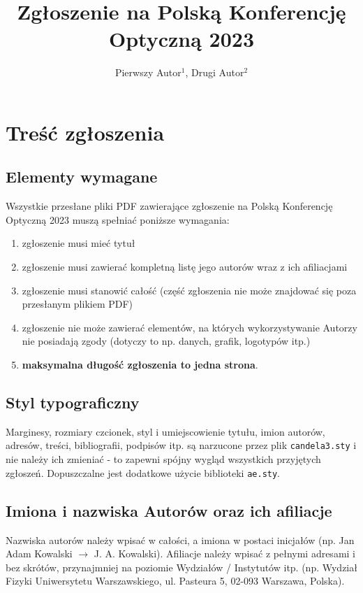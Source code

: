 \documentclass[letterpaper, 10pt]{article}
\begin{document}
\title{Zgłoszenie na Polską Konferencję Optyczną 2023}  %

\author{Pierwszy Autor$^1$, Drugi Autor$^2$}

\address{
$^1$Afiliacja Autora z adresem\\
$^2$Afiliacja Autora z adresem}



\section{Treść zgłoszenia}

\subsection{Elementy wymagane}
Wszystkie przesłane pliki PDF zawierające zgłoszenie na Polską Konferencję Optyczną 2023 muszą spełniać poniższe wymagania:

\begin{enumerate}
\item zgłoszenie musi mieć tytuł
\item zgłoszenie musi zawierać kompletną listę jego autorów wraz z ich afiliacjami
\item zgłoszenie musi stanowić całość (część zgłoszenia nie może znajdować się poza przesłanym plikiem PDF)
\item zgłoszenie nie może zawierać elementów, na których wykorzystywanie Autorzy nie posiadają zgody (dotyczy to np. danych, grafik, logotypów itp.)
\item \textbf{maksymalna długość zgłoszenia to jedna strona}.
\end{enumerate}

\subsection{Styl typograficzny}
Marginesy, rozmiary czcionek, styl i umiejscowienie tytułu, imion autorów, adresów, treści, bibliografii, podpisów itp. są narzucone przez plik \texttt{candela3.sty} i nie należy ich zmieniać - to zapewni spójny wygląd wszystkich przyjętych zgłoszeń. Dopuszczalne jest dodatkowe użycie biblioteki \texttt{ae.sty}.

\subsection{Imiona i nazwiska Autorów oraz ich afiliacje}
Nazwiska autorów należy wpisać w całości, a imiona w postaci inicjałów (np. Jan Adam Kowalski $\rightarrow$ J. A. Kowalski). Afiliacje należy wpisać z pełnymi adresami i bez skrótów, przynajmniej na poziomie Wydziałów / Instytutów itp. (np. Wydział Fizyki Uniwersytetu Warszawskiego, ul. Pasteura 5, 02-093 Warszawa, Polska).
\end{document}
